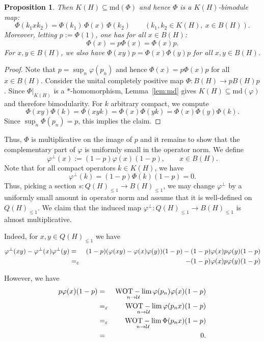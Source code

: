 \documentclass[11pt]{amsproc}
\newcommand{\BH}{B(H)}
\newcommand{\QH}{Q(H)}
\DeclareMathOperator{\WOTlim}{WOT-\lim}
\theoremstyle{definition}
\theoremstyle{plain}
\newtheorem{proposition}[definition]{Proposition}
\theoremstyle{remark}
\begin{document}
\begin{proposition}\label{prop:bimodule}
Then $ K(H)\subseteq \mathrm{md}(\Phi)$ and hence $\Phi$ is a $ K(H)$-bimodule map:
\[\Phi(k_1 x k_2)=\Phi(k_1)\,\Phi(x)\,\Phi(k_2)\qquad(k_1,k_2\in K(H),\ x\in\BH).\]
Moreover, letting $p:=\Phi(1)$, one has for all $x\in B(H)$:
\[\Phi(x)=p\Phi(x)=\Phi(x)p.
\]
For $x,y \in B(H)$, we also have $\Phi(xy)p=\Phi(x)\Phi(y)p$ for all $x,y \in B(H)$.
\end{proposition}

\begin{proof} Note that $p = \sup_n \varphi(p_n)$ and hence $\Phi(x)=p\Phi(x)p$ for all $x \in B(H)$. Consider the unital completely positive map $\Phi \colon B(H) \to p B(H)p$.
Since $\Phi|_{ K(H)}$ is a $*$-homomorphism, Lemma~\ref{lem:md} gives $ K(H)\subseteq \mathrm{md}(\varphi)$ and therefore bimodularity. For $k$ arbitrary compact, we compute $$\Phi(xy)\Phi(k)=\Phi(xyk) = \Phi(x)\Phi(yk)=\Phi(x)\Phi(y)\Phi(k).$$ Since $\sup_n\Phi(p_n) = p$, this implies the claim.
\end{proof}

Thus, $\Phi$ is multiplicative on the image of $p$ and it remains to show that the complementary part of $\varphi$ is uniformly small in the operator norm. We define
\[\varphi^{\perp}(x):=(1-p)\varphi(x)(1-p),\qquad x\in\BH.\] Note that for all compact operators $k \in K(H)$, we have
$$\varphi^{\perp}(k) = (1-p)\Phi(k)(1-p) =0.$$ Thus, picking a section $s \colon \QH_{\le 1} \to B(H)_{\le 1}$, we may change $\varphi^{\perp}$ by a uniformly small amount in operator norm and assume that it is well-defined on $\QH_{\le 1}$. We claim that the induced map $\varphi^{\perp} \colon Q(H)_{\le 1} \to B(H)_{\le 1}$ is almost multiplicative.

Indeed, for $x,y \in Q(H)_{\le 1}$ we have
\begin{eqnarray*}
\varphi^{\perp}(xy) - \varphi^{\perp}(x) \varphi^{\perp}(y) 
&=_{\hspace{0.13cm}}& (1-p)(\varphi(xy)-\varphi(x)\varphi(y))(1-p) - (1-p)\varphi(x)p \varphi(y) (1-p) \\
&=_{\varepsilon}& - (1-p)\varphi(x)p \varphi(y) (1-p)
\end{eqnarray*}

However, we have
\begin{eqnarray*} p \varphi(x)(1-p) 
&=_{\hspace{0.13cm}}&\WOTlim_{n \to \mathcal U} \varphi(p_n) \varphi(x) (1-p) \\
&=_{\varepsilon}&\WOTlim_{n \to \mathcal U} \varphi(p_n x) (1-p) \\
&=_{\varepsilon}&\WOTlim_{n \to \mathcal U} \Phi(p_n x)(1-p) \\
&=_{\hspace{0.13cm}}& 0.
\end{eqnarray*}
\end{document}
